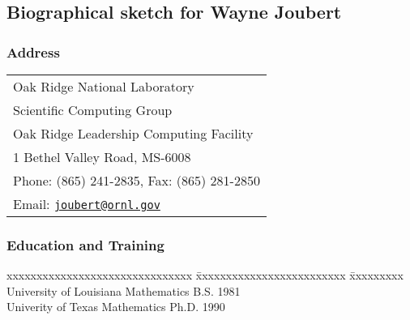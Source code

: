 
\subsection{Biographical sketch for Wayne Joubert}

\subsubsection*{Address}
\begin{tabular}{l}
  Oak Ridge National Laboratory \\
  Scientific Computing Group\\
  Oak Ridge Leadership Computing Facility\\
  1 Bethel Valley Road, MS-6008\\
  Phone:  (865) 241-2835, Fax:    (865) 281-2850	\\
  Email:  \href{mailto:joubert@ornl.gov}{\texttt{joubert@ornl.gov}}
\end{tabular}


\vspace*{-1ex}
\subsubsection*{Education and Training}
\vspace*{-1ex}
\begin{tabbing}
  \hspace*{1ex} 
  xxxxxxxxxxxxxxxxxxxxxxxxxxxxxxx \= xxxxxxxxxxxxxxxxxxxxxxxxx \= xxxxxxxxx \kill
  University of Louisiana \> Mathematics \> B.S.  1981 \\
  Univerity of Texas      \> Mathematics \> Ph.D. 1990
\end{tabbing}


\vspace*{-3ex}
